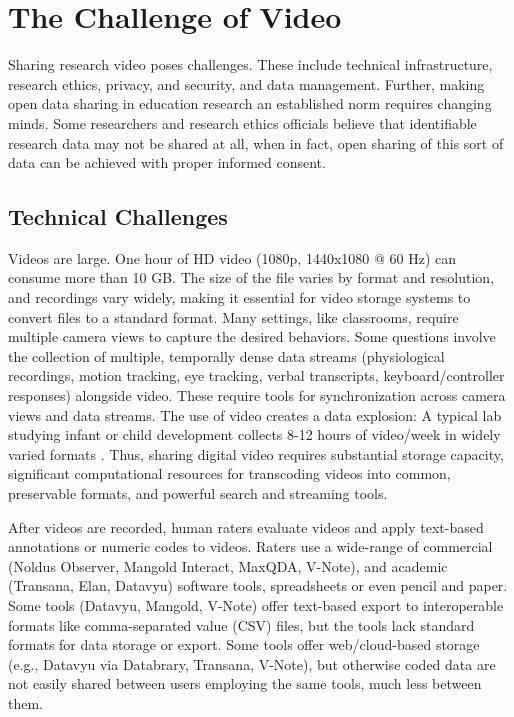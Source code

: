 \documentclass[letterpaper,man,apacite]{apa6}
\begin{document}
\section{The Challenge of Video}

Sharing research video poses challenges.
These include technical infrastructure, research ethics, privacy, and security, and data management. 
Further, making open data sharing in education research an established norm requires changing minds. 
Some researchers and research ethics officials believe that identifiable research data may not be shared at all, when in fact, open sharing of this sort of data can be achieved with proper informed consent.

\subsection{Technical Challenges}

Videos are large.
One hour of HD video (1080p, 1440x1080 @ 60 Hz) can consume more than 10 GB.
The size of the file varies by format and resolution, and recordings vary widely, making it essential for video storage systems to convert files to a standard format.
Many settings, like classrooms, require multiple camera views to capture the desired behaviors.
Some questions involve the collection of multiple, temporally dense data streams (physiological recordings, motion tracking, eye tracking, verbal transcripts, keyboard/controller responses) alongside video.
These require tools for synchronization across camera views and data streams.
The use of video creates a data explosion: A typical lab studying infant or child development collects 8-12 hours of video/week in widely varied formats \cite{Survey2012}. 
Thus, sharing digital video requires substantial storage capacity, significant computational resources for transcoding videos into common, preservable formats, and powerful search and streaming tools. 

After videos are recorded, human raters evaluate videos and apply text-based annotations or numeric codes to videos.
Raters use a wide-range of commercial (Noldus Observer, Mangold Interact, MaxQDA, V-Note), and academic (Transana, Elan, Datavyu) software tools, spreadsheets or even pencil and paper.
Some tools (Datavyu, Mangold, V-Note) offer text-based export to interoperable formats like comma-separated value (CSV) files, but the tools lack standard formats for data storage or export.
Some tools offer web/cloud-based storage (e.g., Datavyu via Databrary, Transana, V-Note), but otherwise coded data are not easily shared between users employing the same tools, much less between them.
\end{document}
